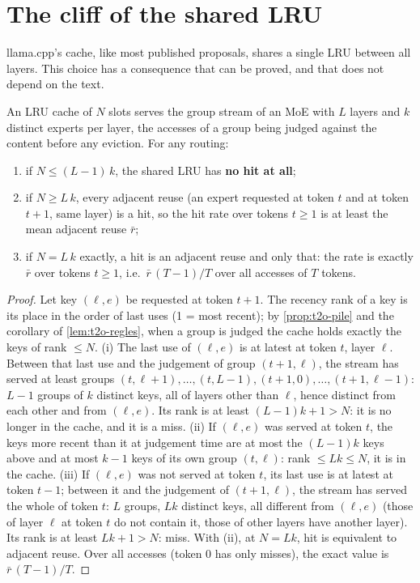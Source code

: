 \section{The cliff of the shared LRU}\label{sec:t2o-falaise}

llama.cpp's cache, like most published proposals, shares a single LRU between all layers. This choice has a consequence that can be proved, and that does not depend on the text.

\begin{proposition}\label{prop:t2o-falaise}
An LRU cache of $N$ slots serves the group stream of an MoE with $L$ layers and $k$ distinct experts per layer, the accesses of a group being judged against the content before any eviction. For any routing:
\begin{enumerate}
\item if $N \le (L-1)\,k$, the shared LRU has \textbf{no hit at all};
\item if $N \ge L\,k$, every adjacent reuse (an expert requested at token $t$ and at token $t+1$, same layer) is a hit, so the hit rate over tokens $t \ge 1$ is at least the mean adjacent reuse $\bar r$;
\item if $N = L\,k$ exactly, a hit is an adjacent reuse and only that: the rate is exactly $\bar r$ over tokens $t \ge 1$, i.e.\ $\bar r\,(T-1)/T$ over all accesses of $T$ tokens.
\end{enumerate}
\end{proposition}

\begin{proof}
Let key $(\ell, e)$ be requested at token $t+1$. The recency rank of a key is its place in the order of last uses (1 = most recent); by \cref{prop:t2o-pile} and the corollary of \cref{lem:t2o-regles}, when a group is judged the cache holds exactly the keys of rank $\le N$.
(i) The last use of $(\ell, e)$ is at latest at token $t$, layer $\ell$. Between that last use and the judgement of group $(t+1, \ell)$, the stream has served at least groups $(t, \ell+1), \ldots, (t, L-1), (t+1, 0), \ldots, (t+1, \ell-1)$: $L - 1$ groups of $k$ distinct keys, all of layers other than $\ell$, hence distinct from each other and from $(\ell, e)$. Its rank is at least $(L-1)k + 1 > N$: it is no longer in the cache, and it is a miss.
(ii) If $(\ell, e)$ was served at token $t$, the keys more recent than it at judgement time are at most the $(L-1)k$ keys above and at most $k - 1$ keys of its own group $(t, \ell)$: rank $\le Lk \le N$, it is in the cache.
(iii) If $(\ell, e)$ was not served at token $t$, its last use is at latest at token $t - 1$; between it and the judgement of $(t+1, \ell)$, the stream has served the whole of token $t$: $L$ groups, $Lk$ distinct keys, all different from $(\ell, e)$ (those of layer $\ell$ at token $t$ do not contain it, those of other layers have another layer). Its rank is at least $Lk + 1 > N$: miss. With (ii), at $N = Lk$, hit is equivalent to adjacent reuse. Over all accesses (token 0 has only misses), the exact value is $\bar r\,(T-1)/T$.
\end{proof}

